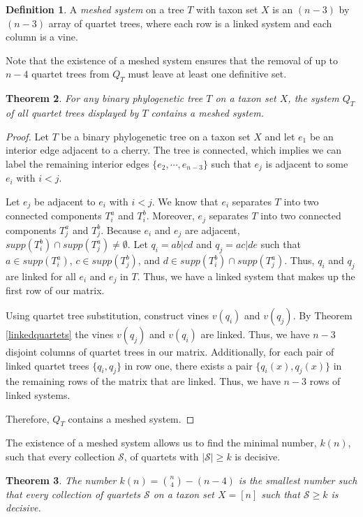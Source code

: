 \documentclass[final,3p,times]{elsarticle}
\newtheorem{thm}{Theorem}[section]
\theoremstyle{definition}
\newtheorem{defn}[thm]{Definition}
\theoremstyle{remark}
\begin{document}
\begin{defn}
A \emph{meshed system} on a tree $T$ with taxon set $X$ is an $(n-3)$ by $(n-3)$ array of quartet trees, where each row is a linked system and each column is a vine.
\end{defn}

Note that the existence of a meshed system  ensures that the removal of up to $n-4$ quartet trees from $Q_T$ must leave at least one definitive set.

\begin{thm}
For any binary phylogenetic tree $T$ on a taxon set $X$, the system $Q_T$ of all quartet trees displayed by $T$ contains a meshed system. 
\label{number}
\end{thm}

\begin{proof}
Let $T$ be a binary phylogenetic tree on a taxon set $X$ and let $e_1$ be an interior edge adjacent to a cherry. The tree is connected, which implies we can label the remaining interior edges $\{e_2, \cdots, e_{n-3} \}$ such that $e_j$ is adjacent to some $e_i$ with $i <j$.

Let $e_j$ be adjacent to $e_i$ with $i<j$. We know that $e_i$ separates $T$ into two connected components $T_i^a$ and $T_i^b$. Moreover, $e_j$ separates $T$ into two connected components $T_j^a$ and $T_j^b$. Because $e_i$ and $e_j$ are adjacent, $supp(T_i^b) \cap supp(T_j^a) \neq \emptyset$. Let $q_i=ab|cd$ and $q_j=ac|de$ such that $a \in supp(T_i^a)$, $c \in supp(T_j^b)$, and $d \in supp(T_i^b) \cap supp(T_j^a)$. Thus, $q_i$ and $q_j$ are linked for all $e_i$ and $e_j$ in $T$. Thus, we have a linked system that makes up the first row of our matrix. 

Using quartet tree substitution, construct vines $v(q_i)$ and $v(q_j)$. By Theorem \ref{linkedquartets}  the vines  $v(q_j)$ and $v(q_i)$ are linked. Thus, we have $n-3$ disjoint columns of quartet trees in our matrix. Additionally, for each pair of linked quartet trees $\{q_i,q_j\}$ in row one, there exists a pair $\{q_i(x),q_j(x)\}$ in the remaining rows of the matrix that are linked. Thus, we have $n-3$ rows of linked systems.  

Therefore, $Q_T$ contains a meshed system. 
\end{proof}

The existence of a meshed system allows us to find the minimal number, $k(n)$, such that every collection $\mathcal{S}$, of quartets with $|\mathcal{S}| \geq k$ is decisive.

\begin{thm}
\label{thm:big}
The  number $k(n)={n \choose 4} - (n-4)$ is the smallest number such that every collection of quartets $\mathcal{S}$ on a taxon set $X=[n]$ such that  $\mathcal{S} \geq k$ is decisive.
\label{minimal}
\end{thm}
\end{document}

